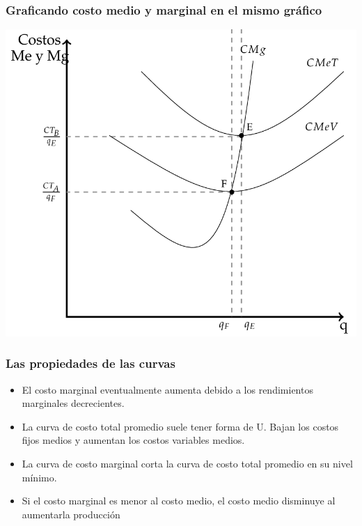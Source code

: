 \documentclass{beamer}
\begin{document}
\begin{frame}
\frametitle{Graficando costo medio y marginal en el mismo gráfico}
\centering
\includegraphics[scale=0.5]{../Figures/C13.8.png}
\end{frame}

\begin{frame}
\frametitle{Las propiedades de las curvas}
\begin{itemize}
    \item El costo marginal eventualmente aumenta debido a los rendimientos marginales decrecientes.
    \item La curva de costo total promedio suele tener forma de U. Bajan los costos fijos medios y aumentan los costos variables medios.
    \item La curva de costo marginal corta la curva de costo total promedio en su nivel mínimo.
    \item Si el costo marginal es menor al costo medio, el costo medio disminuye al aumentarla producción
\end{itemize}
\end{frame}
\end{document}

